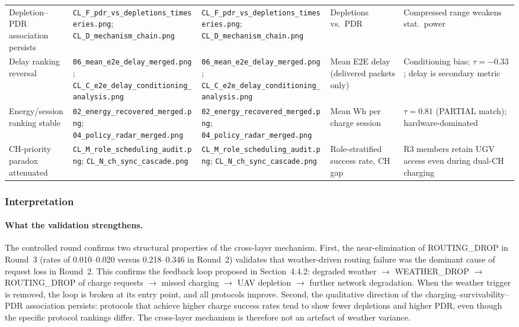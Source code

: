 \begin{table}[htbp]
\begin{tabular}{p{3.2cm} p{2.8cm} p{2.8cm} p{2.5cm} p{2.7cm}}
Depletion--PDR association persists
& \texttt{CL\_F\_pdr\_vs\_depletions\_timeseries.png}; \texttt{CL\_D\_mechanism\_chain.png}
& \texttt{CL\_F\_pdr\_vs\_depletions\_timeseries.png}; \texttt{CL\_D\_mechanism\_chain.png}
& Depletions vs.\ PDR
& Compressed range weakens stat.\ power \\

Delay ranking reversal
& \texttt{06\_mean\_e2e\_delay\_merged.png}; \texttt{CL\_C\_e2e\_delay\_conditioning\_analysis.png}
& \texttt{06\_mean\_e2e\_delay\_merged.png}; \texttt{CL\_C\_e2e\_delay\_conditioning\_analysis.png}
& Mean E2E delay (delivered packets only)
& Conditioning bias; $\tau = -0.33$; delay is secondary metric \\

Energy/session ranking stable
& \texttt{02\_energy\_recovered\_merged.png}; \texttt{04\_policy\_radar\_merged.png}
& \texttt{02\_energy\_recovered\_merged.png}; \texttt{04\_policy\_radar\_merged.png}
& Mean Wh per charge session
& $\tau = 0.81$ (PARTIAL match); hardware-dominated \\

CH-priority paradox attenuated
& \texttt{CL\_M\_role\_scheduling\_audit.png}; \texttt{CL\_N\_ch\_sync\_cascade.png}
& \texttt{CL\_M\_role\_scheduling\_audit.png}; \texttt{CL\_N\_ch\_sync\_cascade.png}
& Role-stratified success rate, CH gap
& R3 members retain UGV access even during dual-CH charging \\

\hline
\end{tabular}
\end{table}

\subsubsection{Interpretation}
\label{sec:results:controlled-validation:interpretation}

\paragraph{What the validation strengthens.}
The controlled round confirms two structural properties of the
cross-layer mechanism.
First, the near-elimination of ROUTING\_DROP in Round~3 (rates of
0.010--0.020 versus 0.218--0.346 in Round~2) validates that
weather-driven routing failure was the dominant cause of request loss
in Round~2.  This confirms the feedback loop proposed in
Section~4.4.2: degraded weather $\to$ WEATHER\_DROP $\to$
ROUTING\_DROP of charge requests $\to$ missed charging $\to$ UAV
depletion $\to$ further network degradation.  When the weather trigger
is removed, the loop is broken at its entry point, and all protocols
improve.
Second, the qualitative direction of the charging--survivability--PDR
association persists: protocols that achieve higher charge success
rates tend to show fewer depletions and higher PDR, even though the
specific protocol rankings differ.  The cross-layer mechanism is
therefore not an artefact of weather variance.

